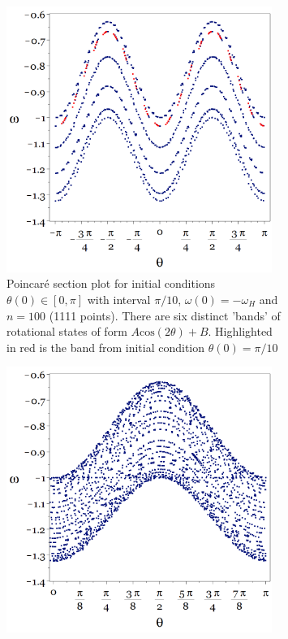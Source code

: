 \documentclass[10pt, twocolumn]{article} %
\begin{document}
\begin{figure}[th!]
  \centering
  \begin{subfigure}[t]{.45\textwidth}
    \centering
    \includegraphics[width=0.95\textwidth]{poincare_nearby_bands.png}
    \caption{Poincar\'e section plot for initial conditions $\theta(0) \in [0, \pi]$ with interval $\pi/10$, $\omega(0) = -\omega_H$ and $n = 100$ (1111 points). There are six distinct 'bands' of rotational states of form $A \mathrm{cos}(2\theta) + B$. Highlighted in red is the band from initial condition $\theta(0) = \pi/10$}
    \label{poincare_bands}
  \end{subfigure}
  \hfill
  \begin{subfigure}[t]{.45\textwidth}
    \centering
    \includegraphics[width=0.95\textwidth]{poincare_nearby_bands_more_samples.png}

\end{subfigure}
\end{figure}
\end{document}
